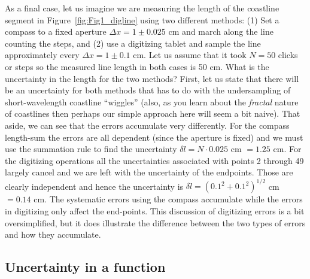 
	As a final case, let us imagine we are measuring the length of the coastline segment 
in Figure~\ref{fig:Fig1_digline} using two 
different methods: (1) Set a compass to a fixed aperture $\Delta x = 1 \pm 0.025$ cm and march along the 
line counting the steps, and (2) use a digitizing tablet and sample the line approximately every $\Delta x = 1 \pm 0.1$ cm.  
Let us assume that it took $N = 50$ clicks or steps so the measured line length in both cases is 50 cm.  What is the 
uncertainty in the length for the two methods?  First, let us state that there will be an uncertainty 
for both methods that has to do with the undersampling of short-wavelength coastline ``wiggles'' (also, as
you learn about the \emph{fractal} nature of coastlines then perhaps our simple approach
here will seem a bit naive).  That 
aside, we can see that the errors accumulate very differently.  For the compass length-sum the 
errors are all dependent (since the aperture is fixed) and we must use the summation rule to find the uncertainty $\delta l = 
N\cdot 0.025$ cm $= 1.25$ cm.  For the digitizing operations all the uncertainties associated with points 2 
through 49 largely cancel and we are left with the uncertainty of the endpoints.  Those are clearly
independent and hence the uncertainty is $\delta l = (0.1^2 + 0.1^2)^{1/2}$ cm $= 0.14$ cm.  The systematic errors 
using the compass accumulate while the errors in digitizing only affect the end-points.  This 
discussion of digitizing errors is a bit oversimplified, but it does illustrate the difference between 
the two types of errors and how they accumulate.

\subsection{Uncertainty in a function}


